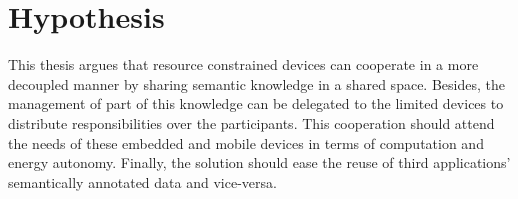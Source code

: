 \section{Hypothesis}
\label{sec:Hypothesis}

This thesis argues that resource constrained devices can cooperate in a more decoupled manner by sharing semantic knowledge in a shared space. %
Besides, the management of part of this knowledge can be delegated to the limited devices to distribute responsibilities over the participants.
This cooperation should attend the needs of these embedded and mobile devices in terms of computation and energy autonomy.
Finally, the solution should ease the reuse of third applications' semantically annotated data and vice-versa.